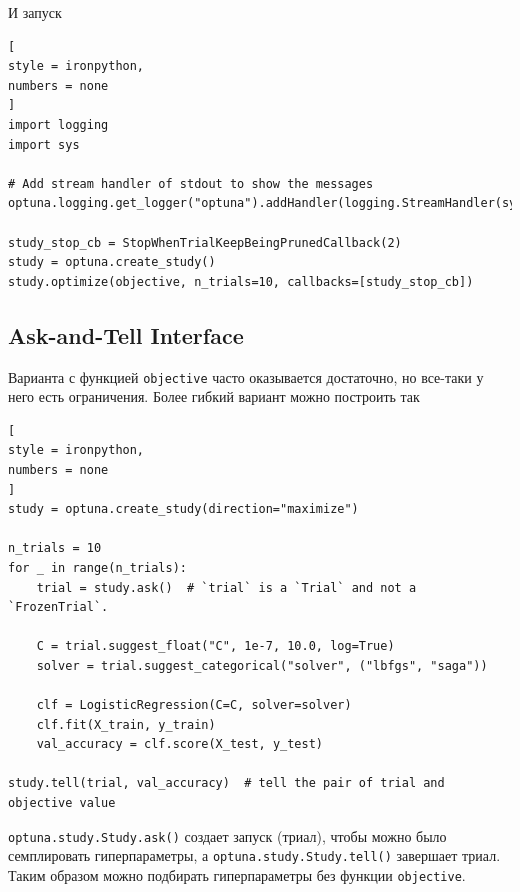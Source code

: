 \documentclass[%
	11pt,
	a4paper,
	utf8,
		]{article}
\begin{document}
И запуск
\begin{lstlisting}[
style = ironpython,
numbers = none
]
import logging
import sys

# Add stream handler of stdout to show the messages
optuna.logging.get_logger("optuna").addHandler(logging.StreamHandler(sys.stdout))

study_stop_cb = StopWhenTrialKeepBeingPrunedCallback(2)
study = optuna.create_study()
study.optimize(objective, n_trials=10, callbacks=[study_stop_cb])
\end{lstlisting}

\subsection{Ask-and-Tell Interface}

Варианта с функцией \verb|objective| часто оказывается достаточно, но все-таки у него есть ограничения. Более гибкий вариант можно построить так
\begin{lstlisting}[
style = ironpython,
numbers = none
]
study = optuna.create_study(direction="maximize")

n_trials = 10
for _ in range(n_trials):
	trial = study.ask()  # `trial` is a `Trial` and not a `FrozenTrial`.
	
	C = trial.suggest_float("C", 1e-7, 10.0, log=True)
	solver = trial.suggest_categorical("solver", ("lbfgs", "saga"))
	
	clf = LogisticRegression(C=C, solver=solver)
	clf.fit(X_train, y_train)
	val_accuracy = clf.score(X_test, y_test)

study.tell(trial, val_accuracy)  # tell the pair of trial and objective value
\end{lstlisting}

\verb|optuna.study.Study.ask()| создает запуск (триал), чтобы можно было семплировать гиперпараметры, а \verb|optuna.study.Study.tell()| завершает триал. Таким образом можно подбирать гиперпараметры без функции \verb|objective|.
\end{document}
